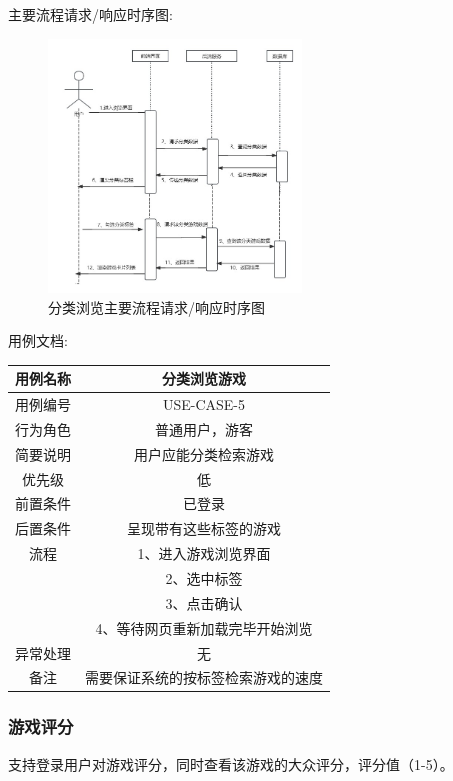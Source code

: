 \documentclass[12pt]{ctexart} %
\begin{document}
主要流程请求/响应时序图:
\begin{figure}[ht]
  \centering
  \includegraphics[width=0.6\textwidth]{yongli5.jpg}
  \caption{分类浏览主要流程请求/响应时序图}
\end{figure}
用例文档:

\begin{tabular}{|c|c|}
  \hline
  用例名称& 分类浏览游戏\\
  \hline
  用例编号 & USE-CASE-5\\
  \hline
  行为角色 & 普通用户，游客\\
  \hline
  简要说明 & 用户应能分类检索游戏\\
  \hline
  优先级 & 低\\
  \hline
  前置条件 & 已登录\\
  \hline
  后置条件 & 呈现带有这些标签的游戏\\
  \hline
  流程 & 1、进入游戏浏览界面\\
       & 2、选中标签\\
       & 3、点击确认\\
       & 4、等待网页重新加载完毕开始浏览\\
  \hline
  异常处理 & 无\\
  \hline
  备注 & 需要保证系统的按标签检索游戏的速度\\
  \hline
\end{tabular}

\subsubsection{游戏评分}
支持登录用户对游戏评分，同时查看该游戏的大众评分，评分值（1-5）。
\end{document}
